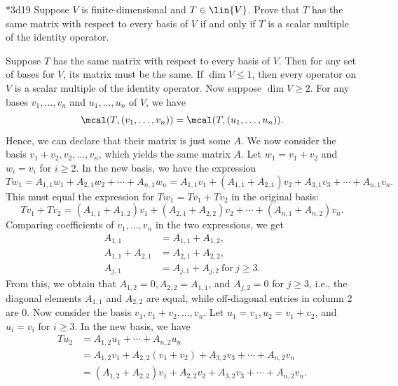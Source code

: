 \begin{exercise}*{3d19}
    Suppose $V$ is finite-dimensional and $T \in \lin{V}$.
	Prove that $T$ has the same matrix with respect to every basis of $V$ if and only if $T$ is a scalar multiple of the identity operator.
\end{exercise}

\begin{sol}
    Suppose $T$ has the same matrix with respect to every basis of $V$.
	Then for any set of bases for $V$, its matrix must be the same.
    If $\dim V \leq 1$, then every operator on $V$ is a scalar multiple of the identity operator.
    Now suppose $\dim V \geq 2$.
	For any bases $v_1, \ldots, v_n$ and $u_1, \ldots, u_n$ of $V$, we have
    \[
    	\mcal(T, (v_1, \ldots, v_n)) = \mcal(T, (u_1, \ldots, u_n)).
    \]
    Hence, we can declare that their matrix is just some $A$.
	We now consider the basis $v_1 + v_2, v_2, \ldots, v_n$, which yields the same matrix $A$.
	Let $w_1 = v_1 + v_2$ and $w_i = v_i$ for $i \geq 2$.
	In the new basis, we have the expression
    \[
    	Tw_1 = A_{1, 1} w_1 + A_{2, 1} w_2 + \cdots + A_{n, 1} w_n = A_{1, 1} v_1 + (A_{1, 1} + A_{2, 1}) v_2 + A_{3, 1} v_3 + \cdots + A_{n, 1} v_n.
    \]
    This must equal the expression for $Tw_1 = Tv_1 + Tv_2$ in the original basis:
    \[
    	Tv_1 + Tv_2 = (A_{1, 1} + A_{1, 2}) v_1 + (A_{2, 1} + A_{2, 2}) v_2 + \cdots + (A_{n, 1} + A_{n, 2}) v_n.
    \]
    Comparing coefficients of $v_1, \ldots, v_n$ in the two expressions, we get
    \begin{align*}
        A_{1, 1} &= A_{1, 1} + A_{1, 2}, \\
        A_{1, 1} + A_{2, 1} &= A_{2, 1} + A_{2, 2}, \\
        A_{j, 1} &= A_{j, 1} + A_{j, 2}~\text{for}~j \geq 3.
    \end{align*}
    From this, we obtain that $A_{1, 2} = 0, A_{2, 2} = A_{1, 1}$, and $A_{j, 2} = 0$ for $j \geq 3$, i.e., the diagonal elements $A_{1, 1}$ and $A_{2, 2}$ are equal, while off-diagonal entries in column 2 are 0.
	Now consider the basis $v_1, v_1 + v_2, \ldots, v_n$.
	Let $u_1 = v_1, u_2 = v_1 + v_2$, and $u_i = v_i$ for $i \geq 3$.
	In the new basis, we have
    \begin{align*}
        Tu_2 &= A_{1, 2}u_1 + \cdots + A_{n, 2}u_n \\
        &= A_{1, 2}v_1 + A_{2, 2}(v_1 + v_2) + A_{3, 2}v_3 + \cdots + A_{n, 2}v_n \\
        &= (A_{1, 2} + A_{2, 2})v_1 + A_{2, 2}v_2 + A_{3, 2}v_3 + \cdots + A_{n, 2}v_n. \\

\end{align*}
\end{sol}
